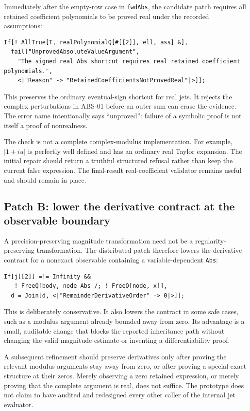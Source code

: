 \documentclass[11pt,a4paper]{article}
\newcommand{\code}[1]{\nolinkurl{#1}}
\begin{document}
Immediately after the empty-row case in \code{fwdAbs}, the candidate patch requires all retained coefficient polynomials to be proved real under the recorded assumptions:
\begin{lstlisting}
If[! AllTrue[T, realPolynomialQ[#[[2]], ell, ass] &],
  fail["UnprovedAbsoluteValueArgument",
    "The signed real Abs shortcut requires real retained coefficient polynomials.",
    <|"Reason" -> "RetainedCoefficientsNotProvedReal"|>]];
\end{lstlisting}
This preserves the ordinary eventual-sign shortcut for real jets. It rejects the complex perturbations in ABS-01 before an outer sum can erase the evidence. The error name intentionally says ``unproved'': failure of a symbolic proof is not itself a proof of nonrealness.

The check is not a complete complex-modulus implementation. For example, $|1+i u|$ is perfectly well defined and has an ordinary real Taylor expansion. The initial repair should return a truthful structured refusal rather than keep the current false expression. The final-result real-coefficient validator remains useful and should remain in place.

\subsection{Patch B: lower the derivative contract at the observable boundary}

A precision-preserving magnitude transformation need not be a regularity-preserving transformation. The distributed patch therefore lowers the derivative contract for a nonexact observable containing a variable-dependent \code{Abs}:
\begin{lstlisting}
If[j[[2]] =!= Infinity &&
   ! FreeQ[body, node_Abs /; ! FreeQ[node, x]],
  d = Join[d, <|"RemainderDerivativeOrder" -> 0|>]];
\end{lstlisting}
This is deliberately conservative. It also lowers the contract in some safe cases, such as a modulus argument already bounded away from zero. Its advantage is a small, auditable change that blocks the reported inheritance path without changing the valid magnitude estimate or inventing a differentiability proof.

A subsequent refinement should preserve derivatives only after proving the relevant modulus arguments stay away from zero, or after proving a special exact structure at their zeros. Merely observing a zero retained expression, or merely proving that the complete argument is real, does not suffice. The prototype does not claim to have audited and redesigned every other caller of the internal jet evaluator.
\end{document}
